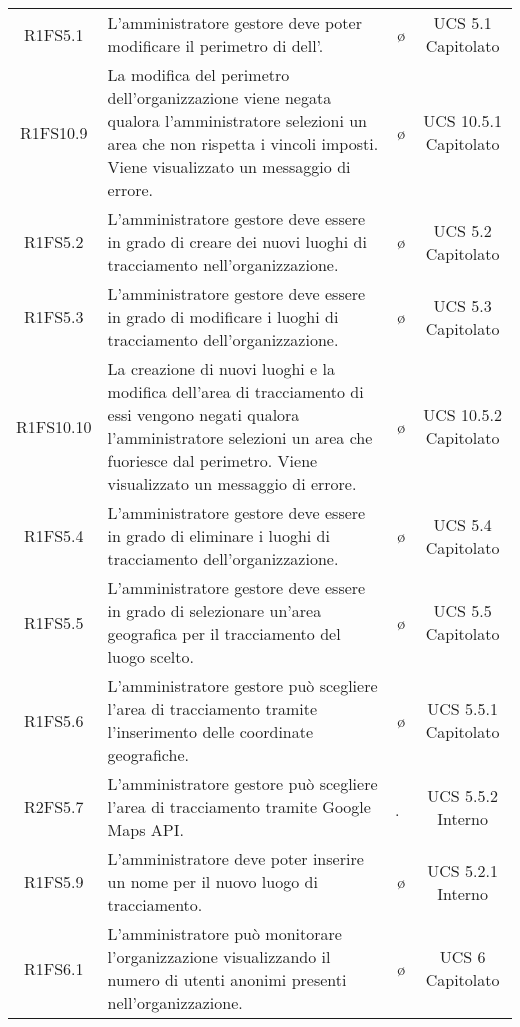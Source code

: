 {\begin{longtable}{ c C{6.5cm} c c}
R1FS5.1 & L'amministratore gestore deve poter modificare il perimetro di  dell'. & \o & UCS 5.1 Capitolato\\

R1FS10.9 & La modifica del perimetro dell'organizzazione viene negata qualora l'amministratore selezioni un area che non rispetta i vincoli imposti. Viene visualizzato un messaggio di errore. & \o & UCS 10.5.1 Capitolato \\

R1FS5.2 & L'amministratore gestore deve essere in grado di creare dei nuovi luoghi di tracciamento nell'organizzazione. & \o & UCS 5.2 Capitolato\\

R1FS5.3 & L'amministratore gestore deve essere in grado di modificare i luoghi di tracciamento dell'organizzazione. & \o & UCS 5.3 Capitolato\\

R1FS10.10 & La creazione di nuovi luoghi e la modifica dell'area di tracciamento di essi vengono negati qualora l'amministratore selezioni un area che fuoriesce dal perimetro. Viene visualizzato un messaggio di errore. & \o & UCS 10.5.2 Capitolato \\

R1FS5.4 & L'amministratore gestore deve essere in grado di eliminare i luoghi di tracciamento dell'organizzazione. & \o & UCS 5.4 Capitolato\\

R1FS5.5 & L'amministratore gestore deve essere in grado di selezionare un'area geografica per il tracciamento del luogo scelto. & \o & UCS 5.5 Capitolato\\

R1FS5.6 & L'amministratore gestore può scegliere l'area di tracciamento tramite l'inserimento delle coordinate geografiche. & \o & UCS 5.5.1 Capitolato\\

R2FS5.7 & L'amministratore gestore può scegliere l'area di tracciamento tramite Google Maps API. & \d & UCS 5.5.2 Interno\\

R1FS5.9 & L'amministratore deve poter inserire un nome per il nuovo luogo di tracciamento. & \o & UCS 5.2.1 Interno\\

R1FS6.1 & L'amministratore può monitorare l'organizzazione visualizzando il numero di utenti anonimi presenti nell'organizzazione. & \o & UCS 6 Capitolato\\


\end{longtable}}
